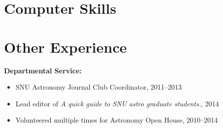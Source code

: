 \documentclass[11pt,letterpaper,roman]{moderncv}        %
\begin{document}
\section{Computer Skills}

\section{Other Experience}
\textbf{Departmental Service:}
\begin{itemize}
\setlength\itemsep{0.0em}
\item SNU Astronomy Journal Club Coordinator, 2011--2013
\item Lead editor of \textit{A quick guide to SNU astro graduate students.}, 2014
\item Volunteered multiple times for Astronomy Open House, 2010--2014
\end{itemize}

\end{document}
